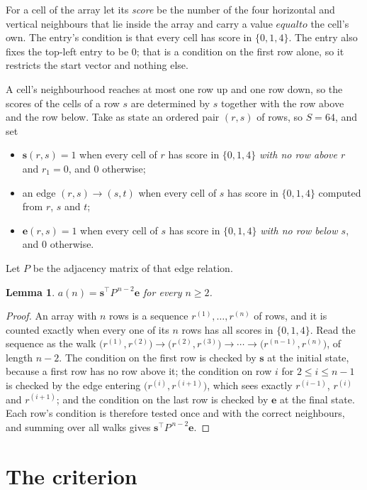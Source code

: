 \documentclass[11pt,a4paper]{article}
\theoremstyle{plain}
\newtheorem{lemma}[theorem]{Lemma}
\theoremstyle{definition}
\begin{document}
For a cell of the array let its \emph{score} be the number of the four horizontal and vertical neighbours that lie inside
the array and carry a value $equal to$ the cell's own. The entry's condition is that every cell
has score in $\{0,1,4\}$. The entry also fixes the top-left entry to be $0$; that is a condition on the first row alone, so it restricts the start vector and nothing else.

A cell's neighbourhood reaches at most one row up and one row down, so the scores of the
cells of a row $s$ are determined by $s$ together with the row above and the row below.
Take as state an ordered pair $(r,s)$ of rows, so $S=64$, and set
\begin{itemize}
\item $\mathbf{s}(r,s)=1$ when every cell of $r$ has score in $\{0,1,4\}$ \emph{with no row
above $r$} and $r_1=0$, and $0$ otherwise;
\item an edge $(r,s)\to(s,t)$ when every cell of $s$ has score in $\{0,1,4\}$ computed from
$r$, $s$ and $t$;
\item $\mathbf{e}(r,s)=1$ when every cell of $s$ has score in $\{0,1,4\}$ \emph{with no row
below $s$}, and $0$ otherwise.
\end{itemize}
Let $P$ be the adjacency matrix of that edge relation.

\begin{lemma}\label{lem:walk}
$a(n)=\mathbf{s}^{\!\top}P^{\,n-2}\mathbf{e}$ for every $n\ge2$.
\end{lemma}

\begin{proof}
An array with $n$ rows is a sequence $r^{(1)},\dots,r^{(n)}$ of rows, and it is counted
exactly when every one of its $n$ rows has all scores in $\{0,1,4\}$. Read the sequence as the
walk $\bigl(r^{(1)},r^{(2)}\bigr)\to\bigl(r^{(2)},r^{(3)}\bigr)\to\cdots\to
\bigl(r^{(n-1)},r^{(n)}\bigr)$, of length $n-2$. The condition on the first row is
checked by $\mathbf{s}$ at the initial state, because a first row has no row above it; the
condition on row $i$ for $2\le i\le n-1$ is checked by the edge entering
$\bigl(r^{(i)},r^{(i+1)}\bigr)$, which sees exactly $r^{(i-1)}$, $r^{(i)}$ and
$r^{(i+1)}$; and the condition on the last row is checked by $\mathbf{e}$ at the final
state. Each row's condition is therefore tested once and with the correct neighbours, and
summing over all walks gives $\mathbf{s}^{\!\top}P^{\,n-2}\mathbf{e}$.
\end{proof}

\section{The criterion}
\end{document}
